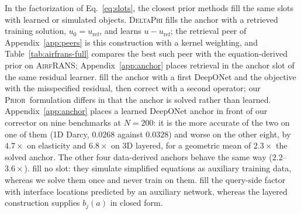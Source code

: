 \documentclass{article}
\newcommand{\armprior}{\textsc{Prior}}
\begin{document}
In the factorization of Eq.~\ref{eq:slots}, the closest prior methods fill the same
slots with learned or simulated objects. \textsc{DeltaPhi} \citep{yue2025deltaphi}
fills the anchor with a retrieved training solution, $u_0=u_{\mathrm{ref}}$, and
learns $u-u_{\mathrm{ref}}$; the retrieval peer of Appendix~\ref{app:peers} is this
construction with a kernel weighting, and Table~\ref{tab:airfrans-full} compares the
best such peer with the equation-derived prior on \textsc{AirfRANS};
Appendix~\ref{app:anchor} places retrieval in the anchor slot of the same residual
learner.
\citet{ma2026physics} fill the anchor with a first DeepONet and the objective with the
misspecified residual, then correct with a second operator; our \armprior\ formulation differs
in that the anchor is solved rather than learned. Appendix~\ref{app:anchor} places a learned
DeepONet anchor in front of our corrector on nine benchmarks at $N{=}200$: it is the more accurate
of the two on one of them (1D Darcy, $0.0268$ against $0.0328$) and worse on the other eight,
by $4.7\times$ on elasticity and $6.8\times$ on 3D layered, for a geometric mean of $2.3\times$
the solved anchor. The other four data-derived anchors behave the same way
($2.2$--$3.6\times$). \citet{ma2026learning} fill no slot: they
simulate simplified equations as auxiliary training data, whereas we solve them once
and never train on them. \citet{dang2026smooth} fill the query-side factor with interface
locations predicted by an auxiliary network, whereas the layered construction supplies
$b_j(a)$ in closed form.
\end{document}

